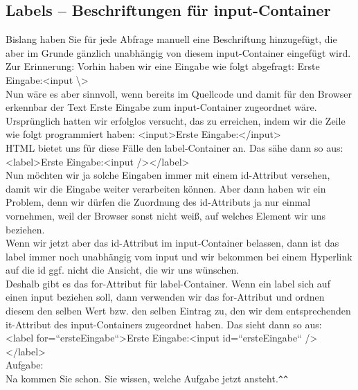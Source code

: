 \subsection{Labels – Beschriftungen für input-Container}

Bislang haben Sie für jede Abfrage manuell eine Beschriftung hinzugefügt, die aber im Grunde gänzlich unabhängig von diesem input-Container eingefügt wird. Zur Erinnerung: Vorhin haben wir eine Eingabe wie folgt abgefragt: Erste Eingabe:<input \textbackslash>\\

Nun wäre es aber sinnvoll, wenn bereits im Quellcode und damit für den Browser erkennbar der Text Erste Eingabe zum input-Container zugeordnet wäre. Ursprünglich hatten wir erfolglos versucht, das zu erreichen, indem wir die Zeile wie folgt programmiert haben: <input>Erste Eingabe:</input>\\

HTML bietet uns für diese Fälle den label-Container an. Das sähe dann so aus:
<label>Erste Eingabe:<input /></label>\\

Nun möchten wir ja solche Eingaben immer mit einem id-Attribut versehen, damit wir die Eingabe weiter verarbeiten können. Aber dann haben wir ein Problem, denn wir dürfen die Zuordnung des id-Attributs ja nur einmal vornehmen, weil der Browser sonst nicht weiß, auf welches Element wir uns beziehen.\\

Wenn wir jetzt aber das id-Attribut im input-Container belassen, dann ist das label immer noch unabhängig vom input und wir bekommen bei einem Hyperlink auf die id ggf. nicht die Ansicht, die wir uns wünschen.\\

Deshalb gibt es das for-Attribut für label-Container. Wenn ein label sich auf einen input beziehen soll, dann verwenden wir das for-Attribut und ordnen diesem den selben Wert bzw. den selben Eintrag zu, den wir dem entsprechenden it-Attribut des input-Containers zugeordnet haben. Das sieht dann so aus:\\

<label for=``ersteEingabe``>Erste Eingabe:<input id=``ersteEingabe`` /></label>\\

Aufgabe:\\

Na kommen Sie schon. Sie wissen, welche Aufgabe jetzt ansteht.\verb|^^|\\

